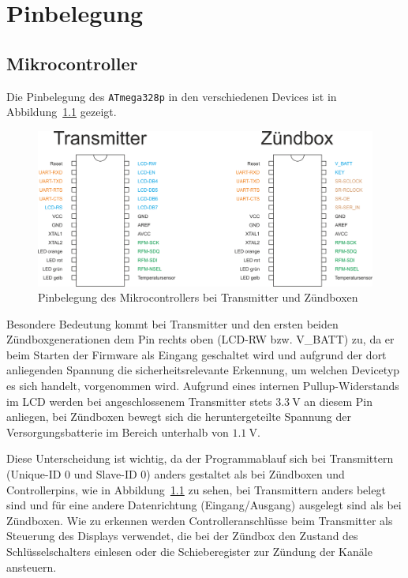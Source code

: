 \documentclass[paper=a4, parskip, numbers=noenddot, toc=listof, headsepline]{scrbook}
\begin{document}
	\chapter{Pinbelegung}
		\label{ch:pinbelegung}

		\section{Mikrocontroller}
			Die Pinbelegung des \texttt{ATmega328p} in den verschiedenen Devices ist in Abbildung~\ref{fig:pinout} gezeigt.

			\begin{figure}
				\centering
				\includegraphics[width=.7\textwidth]{Bilder/pinout}
				\caption{Pinbelegung des Mikrocontrollers bei Transmitter und Zündboxen}
				\label{fig:pinout}
			\end{figure}

			Besondere Bedeutung kommt bei Transmitter und den ersten beiden Zündboxgenerationen dem Pin rechts oben (LCD-RW bzw. V\_BATT) zu, da er beim Starten der Firmware als Eingang geschaltet wird und aufgrund der dort anliegenden Spannung die sicherheitsrelevante Erkennung, um welchen Devicetyp es sich handelt, vorgenommen wird. Aufgrund eines internen Pullup-Widerstands im LCD werden bei angeschlossenem Transmitter stets $\SI{3,3}{\volt}$ an diesem Pin anliegen, bei Zündboxen bewegt sich die heruntergeteilte Spannung der Versorgungsbatterie im Bereich unterhalb von $\SI{1,1}{\volt}$.

			Diese Unterscheidung ist wichtig, da der Programmablauf sich bei Transmittern (Unique-ID 0 und Slave-ID 0) anders gestaltet als bei Zündboxen und Controllerpins, wie in Abbildung~\ref{fig:pinout} zu sehen, bei Transmittern anders belegt sind und für eine andere Datenrichtung (Eingang/Ausgang) ausgelegt sind als bei Zündboxen.  Wie zu erkennen werden Controlleranschlüsse beim Transmitter als Steuerung des Displays verwendet, die bei der Zündbox den Zustand des Schlüsselschalters einlesen oder die Schieberegister zur Zündung der Kanäle ansteuern.
\end{document}

